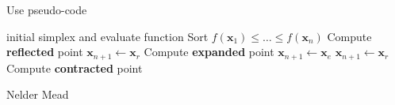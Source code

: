 \documentclass[10pt]{beamer}
\begin{document}
                                                                                              \begin{frame}{Use pseudo-code}
                                                                                                \begin{algorithm}[H]
                                                                                                  \begin{algorithmic}[1]
                                                                                                     initial simplex and evaluate function
                                                                                                    \STATE Sort $f({\bm x_1})\leq\ldots\leq f({\bm x_n}) $
                                                                                                    \STATE Compute {\bf reflected} point
                                                                                                    \RETURN ${\bm x_{n+1}}\gets{\bm x_{r}}$
                                                                                                    \STATE Compute {\bf expanded} point
                                                                                                    \RETURN ${\bm x_{n+1}}\gets{\bm x_{e}}$
                                                                                                    \RETURN ${\bm x_{n+1}}\gets{\bm x_{r}}$
                                                                                                    \ENDIF
                                                                                                    \STATE Compute {\bf contracted} point
                                                                                                    \ENDIF
                                                                                                    \caption{Nelder Mead}
                                                                                                  \end{algorithmic}
                                                                                                \end{algorithm}
                                                                                              \end{frame}
\end{document}
